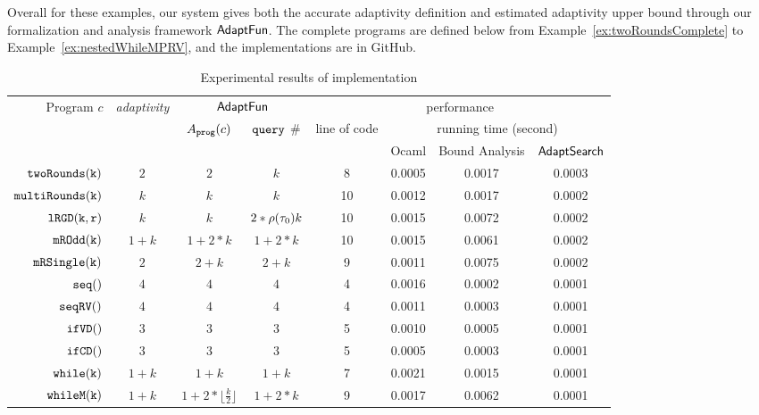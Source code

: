 Overall for these examples, our system gives both the accurate adaptivity definition and estimated
adaptivity upper bound through our formalization and analysis framework $\textsf{AdaptFun}$.
The complete programs are defined below from Example~\ref{ex:twoRoundsComplete} to Example~\ref{ex:nestedWhileMPRV},
and the implementations are in GitHub.
{\tiny
\begin {table}[H]
    \caption{Experimental results of {\THESYSTEM} implementation}
        \label{tb:adapt-imp}
        \begin{center}
        \centering
{\footnotesize
        \begin{tabular}{ r | c | c | c | c | c | c | c  }
        \multirow{3}{*}{Program $c$} & 
        \multirow{3}{*}{\emph{adaptivity}}
         & \multicolumn{2}{c|}{$\textsf{AdaptFun}$}
         & \multicolumn{4}{c}{performance} \\ 
         \cline{3-8}
         & & \multirow{2}{*}{$A_{\mathtt{prog}}(c)$} & \multirow{2}{*}{${\tt query}$ \#} & \multirow{2}{*}{line of code} & \multicolumn{3}{c}{running time (second)} \\ 
         \cline{6-8}
         & & & &  & Ocaml & Bound Analysis & $\mathsf{AdaptSearch}$  \\
         \hline \hline
         $  \mathtt{twoRounds(k)}$ & $2$ &  $2$ & $k$ & 8 & 0.0005 & 0.0017 & 0.0003 \\
         $  \mathtt{multiRounds(k)}$ & $k$ &  $k$ & $k$  &  10 & 0.0012 & 0.0017 & 0.0002 \\
         $  \mathtt{lRGD(k, r)}$ & $k$ & $k$ & $2 * \rho(\mathtt{\tau}_0) k$  &  10 & 0.0015 & 0.0072& 0.0002  \\
         $  \mathtt{mROdd(k)}$ & $1 + k$ &  $1 +2 * k$ & $1 + 2*k$  &  10 & 0.0015 & 0.0061 & 0.0002 \\
         $  \mathtt{mRSingle(k)}$    & $2$ &  $2 + k$ & $2 + k$  &  9 & 0.0011 & 0.0075 & 0.0002 \\
         $  \mathtt{seq()}$ & $4$ & $4$ & $4$ & 4 & 0.0016 & 0.0002 & 0.0001 \\ 
         $  \mathtt{seqRV()}$ & $4$ & $4$ &  $4$ & 4 & 0.0011 & 0.0003 & 0.0001 \\  
         $  \mathtt{ifVD()}$ & $3$ & $3$ &  $3$ & 5 & 0.0010 & 0.0005  & 0.0001 \\
         $  \mathtt{ifCD()}$ & $3$ & $3$ &   $3$  & 5 & 0.0005 & 0.0003  & 0.0001 \\
         $  \mathtt{while(k)}$ & $1+k$ &   $1+k$  &  $1+k$ & 7 & 0.0021 & 0.0015 &  0.0001 \\
         $  \mathtt{whileM(k)}$ & $1 + k$ &  $1 +2 * \lfloor \frac{k}{2} \rfloor$ & $1 + 2 * k$  &  9 & 0.0017 & 0.0062 & 0.0001  \\

\end{tabular}}
\end{center}
\end{table}}

